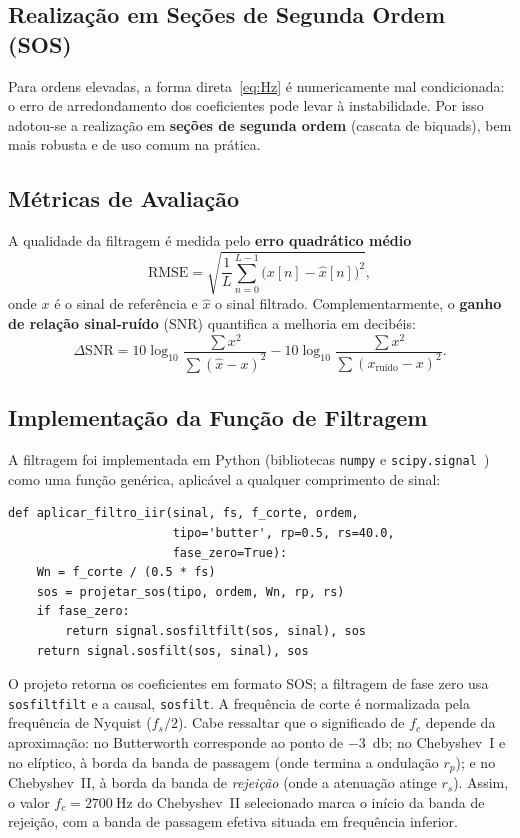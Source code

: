 \subsection{Realização em Seções de Segunda Ordem (SOS)}
Para ordens elevadas, a forma direta~\eqref{eq:Hz} é numericamente mal
condicionada: o erro de arredondamento dos coeficientes pode levar à
instabilidade. Por isso adotou-se a realização em \textbf{seções de segunda
ordem} (cascata de biquads), bem mais robusta e de uso comum na prática.

\subsection{Métricas de Avaliação}
A qualidade da filtragem é medida pelo \textbf{erro quadrático médio}
\begin{equation}
\mathrm{RMSE} = \sqrt{\frac{1}{L}\sum_{n=0}^{L-1}
\bigl(x[n] - \hat{x}[n]\bigr)^2},
\label{eq:rmse}
\end{equation}
onde $x$ é o sinal de referência e $\hat{x}$ o sinal filtrado. Complementarmente,
o \textbf{ganho de relação sinal-ruído} (SNR) quantifica a melhoria em decibéis:
\begin{equation}
\Delta\mathrm{SNR} = 10\log_{10}\!\frac{\sum x^2}{\sum (\hat{x}-x)^2}
                   - 10\log_{10}\!\frac{\sum x^2}{\sum (x_{\text{ruído}}-x)^2}.
\label{eq:snr}
\end{equation}

\subsection{Implementação da Função de Filtragem}
A filtragem foi implementada em Python (bibliotecas \texttt{numpy} e
\texttt{scipy.signal}~\cite{scipy}) como uma função genérica, aplicável a qualquer
comprimento de sinal:

\begin{lstlisting}
def aplicar_filtro_iir(sinal, fs, f_corte, ordem,
                       tipo='butter', rp=0.5, rs=40.0,
                       fase_zero=True):
    Wn = f_corte / (0.5 * fs)
    sos = projetar_sos(tipo, ordem, Wn, rp, rs)
    if fase_zero:
        return signal.sosfiltfilt(sos, sinal), sos
    return signal.sosfilt(sos, sinal), sos
\end{lstlisting}

O projeto retorna os coeficientes em formato SOS; a filtragem de fase zero usa
\texttt{sosfiltfilt} e a causal, \texttt{sosfilt}. A frequência de corte é
normalizada pela frequência de Nyquist ($f_s/2$). Cabe ressaltar que o
significado de $f_c$ depende da aproximação: no Butterworth corresponde ao ponto
de \SI{-3}{\decibel}; no Chebyshev~I e no elíptico, à borda da banda de passagem
(onde termina a ondulação $r_p$); e no Chebyshev~II, à borda da banda de
\emph{rejeição} (onde a atenuação atinge $r_s$). Assim, o valor
$f_c=\SI{2700}{\hertz}$ do Chebyshev~II selecionado marca o início da banda de
rejeição, com a banda de passagem efetiva situada em frequência inferior.

